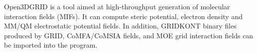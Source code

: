 Open3DGRID is a tool aimed at high-throughput generation of molecular interaction fields (MIFs). It can compute steric potential, electron density and MM/QM electrostatic potential fields. In addition, GRIDKONT binary files produced by GRID, CoMFA/CoMSIA fields, and MOE grid interaction fields can be imported into the program. 